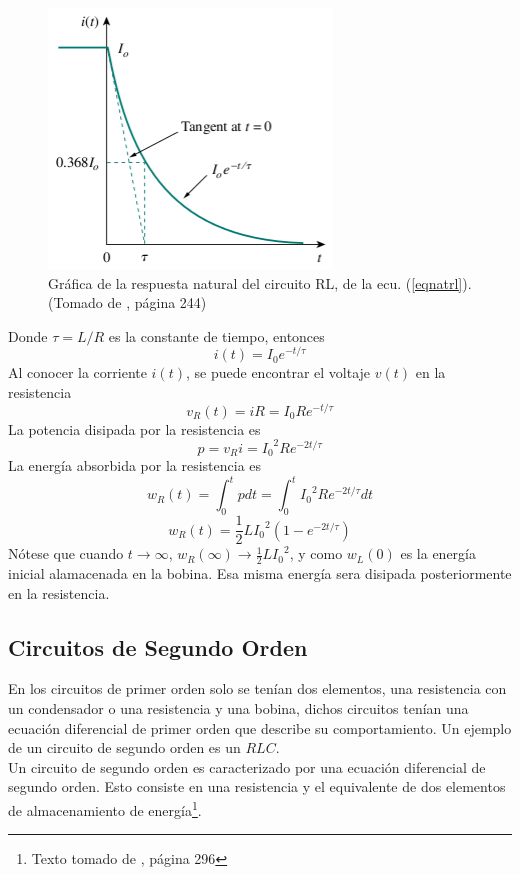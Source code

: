 \documentclass[twocolumn]{IEEEtran}
\begin{document}
\begin{figure}[H]
	\centering
		\includegraphics[scale=0.6]{respnatrl.png}
	\caption{Gráfica de la respuesta natural del circuito RL, de la ecu. (\ref{eqnatrl}). (Tomado de \cite{sadiku}, página 244)}
	\label{respnatrl}
\end{figure}
\noindent
Donde $\tau = L/R$ es la constante de tiempo, entonces
\begin{equation}
 i(t) = I_{0}{e^{ - t/\tau}}
\label{ecu2}
\end{equation}
\noindent
Al conocer la corriente $i(t)$, se puede encontrar el voltaje $v(t)$ en la resistencia
\begin{equation}
 v_{R}(t) = i R = I_{0} R {e^{ - t/\tau}}
\end{equation}
\noindent
La potencia disipada por la resistencia es
\begin{equation}
 p=v_{R}i=  {I_{0}}^{2} R {e^{ - 2t/\tau}}
\end{equation}
\noindent
La energía absorbida por la resistencia es
\begin{equation}
 {w_R}(t) = \int_0^t {pdt}  = \int_0^t {{I_0}^2R{e^{ - 2t/\tau }}} dt
\end{equation}
\begin{equation}
 {w_R}(t) = \frac{1}{2}L{I_0}^2\left( {1 - {e^{ - 2t/\tau }}} \right)
\end{equation}
\noindent
Nótese que cuando $t \rightarrow \infty$, $w_R(\infty) \rightarrow \frac{1}{2}L{I_0}^2$, y como $w_L(0)$ es la energía inicial alamacenada en la bobina. Esa misma energía sera disipada posteriormente en la resistencia.

\subsection{Circuitos de Segundo Orden}
\noindent
En los circuitos de primer orden solo se tenían dos elementos, una resistencia con un condensador o una resistencia y una bobina, dichos circuitos tenían una ecuación diferencial de primer orden que describe su comportamiento. Un ejemplo de un circuito de segundo orden es un $RLC$.\\
Un circuito de segundo orden es caracterizado por una ecuación diferencial de segundo orden. Esto consiste en una resistencia y el equivalente de dos elementos de almacenamiento de energía\footnote{Texto tomado de \cite{sadiku}, página 296}.
\end{document}
